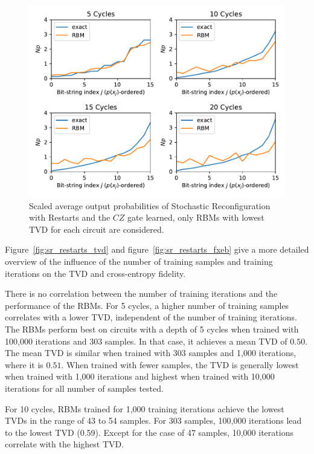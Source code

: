 \begin{figure}[H]
  \centering
  \includegraphics[width=\textwidth]{figures/results/SR-restarts-learned/avgBestPDF.pdf}
  \caption[Averaged best performing scaled output probabilities of Stochastic Reconfiguration with Restarts Learned]{
    Scaled average output probabilities of Stochastic Reconfiguration with Restarts and the $CZ$ gate learned, only RBMs with lowest
    TVD for each circuit are considered.}
  \label{fig:sr_restarts_bestPDF}
\end{figure}

Figure~\ref{fig:sr_restarts_tvd} and figure~\ref{fig:sr_restarts_fxeb} give a more detailed overview of the influence of the 
number of training samples and training iterations on the TVD and cross-entropy fidelity. 

There is no correlation between the number of training
iterations and the performance of the RBMs. For 5 cycles, a higher number of training samples correlates
with a lower TVD, independent of the number of training iterations. The RBMs perform best on 
circuits with a depth of 5 cycles when trained with 100,000 iterations and 303 samples. In that case, 
it achieves a mean TVD of $0.50$. The mean TVD is similar when trained with 303 samples and 1,000 iterations, 
where it is $0.51$. When trained with fewer samples, the TVD is generally lowest when trained with 1,000 
iterations and highest when trained with 10,000 iterations for all number of samples tested. 

For 10 cycles, RBMs trained for 1,000 training iterations achieve the lowest TVDs in the range of 43 to 
54 samples. For 303 samples, 100,000 iterations lead to the lowest TVD (0.59). Except for the 
case of 47 samples, 10,000 iterations correlate with the highest TVD.

